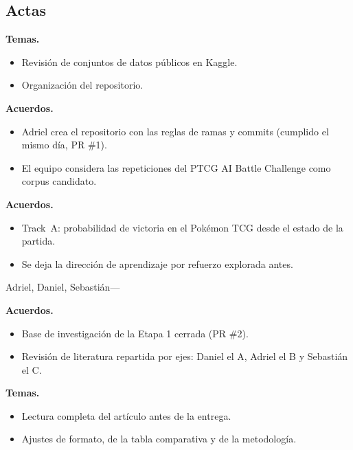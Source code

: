 \subsection{Actas}


\noindent\textbf{Temas.}
\begin{itemize}
  \item Revisi\'on de conjuntos de datos p\'ublicos en Kaggle.
  \item Organizaci\'on del repositorio.
\end{itemize}

\noindent\textbf{Acuerdos.}
\begin{itemize}
  \item Adriel crea el repositorio con las reglas de ramas y commits
        (cumplido el mismo d\'ia, PR \#1).
  \item El equipo considera las repeticiones del PTCG AI Battle Challenge
        como corpus candidato.
\end{itemize}


\noindent\textbf{Acuerdos.}
\begin{itemize}
  \item Track~A: probabilidad de victoria en el Pok\'emon TCG desde el estado
        de la partida.
  \item Se deja la direcci\'on de aprendizaje por refuerzo explorada
        antes.
\end{itemize}

%
       {Adriel, Daniel, Sebasti\'an}{---}

\noindent\textbf{Acuerdos.}
\begin{itemize}
  \item Base de investigaci\'on de la Etapa 1 cerrada (PR \#2).
  \item Revisi\'on de literatura repartida por ejes: Daniel el A, Adriel el
        B y Sebasti\'an el C.
\end{itemize}


\noindent\textbf{Temas.}
\begin{itemize}
  \item Lectura completa del art\'iculo antes de la entrega.
  \item Ajustes de formato, de la tabla comparativa y de la metodolog\'ia.
\end{itemize}

